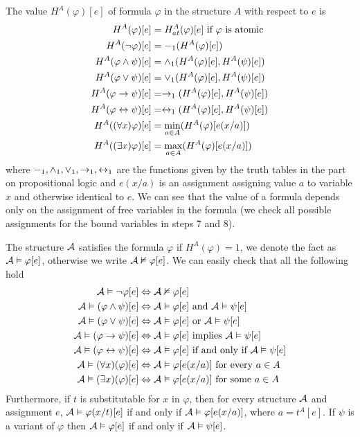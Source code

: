 The value $H^A(\varphi)[e]$ of formula $\varphi$ in the structure $A$ with respect to $e$ is 
\begin{align*}
	H^A(\varphi)[e] & = H^A_{at}(\varphi)[e] \text{ if } \varphi \text{ is atomic} \\
	H^A(\neg \varphi)[e] & = -_1(H^A(\varphi)[e])\\
	H^A(\varphi \land \psi)[e] & = \land_1(H^A(\varphi)[e], H^A(\psi)[e])\\
	H^A(\varphi \lor \psi)[e] & = \lor_1(H^A(\varphi)[e], H^A(\psi)[e])\\
	H^A(\varphi \to \psi)[e] & = \to_1(H^A(\varphi)[e], H^A(\psi)[e])\\
	H^A(\varphi \leftrightarrow \psi)[e] & = \leftrightarrow_1(H^A(\varphi)[e], H^A(\psi)[e])\\
	H^A((\forall x)\varphi)[e] & = \min_{a \in A}(H^A(\varphi)[e(x/a)])\\
	H^A((\exists x)\varphi)[e] & = \max_{a \in A}(H^A(\varphi)[e(x/a)])
\end{align*}
where $-_1, \land_1, \lor_1, \to_1, \leftrightarrow_1$ are the functions given by the truth tables in the part on propositional logic and $e(x/a)$ is an assignment  assigning value $a$ to variable $x$ and otherwise identical to $e$. We can see that the value of a formula depends only on the assignment of free variables in the formula (we check all possible assignments for the bound variables in steps 7 and 8).

The structure $\mathcal{A}$ satisfies the formula $\varphi$ if $H^A(\varphi) = 1$, we denote the fact as $\mathcal{A} \vDash \varphi[e]$, otherwise we write $\mathcal{A} \nvDash \varphi[e]$. We can easily check that all the following hold
\begin{align*}
\mathcal{A} \vDash \neg \varphi[e] & \Leftrightarrow \mathcal{A} \nvDash \varphi[e] \\
\mathcal{A} \vDash (\varphi \land \psi)[e] & \Leftrightarrow \mathcal{A} \vDash \varphi[e] \text{ and } \mathcal{A} \vDash \psi[e]\\
\mathcal{A} \vDash (\varphi \lor \psi)[e] & \Leftrightarrow \mathcal{A} \vDash \varphi[e] \text{ or } \mathcal{A} \vDash \psi[e]\\ 
\mathcal{A} \vDash (\varphi \to \psi)[e] & \Leftrightarrow \mathcal{A} \vDash \varphi[e] \text{ implies } \mathcal{A} \vDash \psi[e]\\
\mathcal{A} \vDash (\varphi \leftrightarrow \psi)[e] & \Leftrightarrow \mathcal{A} \vDash \varphi[e] \text{ if and only if } \mathcal{A} \vDash \psi[e]\\
\mathcal{A} \vDash (\forall x)(\varphi)[e] & \Leftrightarrow \mathcal{A} \vDash \varphi[e(x/a)] \text{ for every } a \in A \\
\mathcal{A} \vDash (\exists x)(\varphi)[e] & \Leftrightarrow \mathcal{A} \vDash \varphi[e(x/a)] \text{ for some } a \in A
\end{align*}
Furthermore, if $t$ is substitutable for $x$ in $\varphi$, then for every structure $\mathcal{A}$ and assignment $e$, $\mathcal{A} \vDash \varphi(x/t)[e]$ if and only if $\mathcal{A} \vDash \varphi[e(x/a)]$, where $a = t^A[e]$. If $\psi$ is a variant of $\varphi$ then $\mathcal{A} \vDash \varphi[e]$ if and only if $\mathcal{A} \vDash \psi[e]$.

